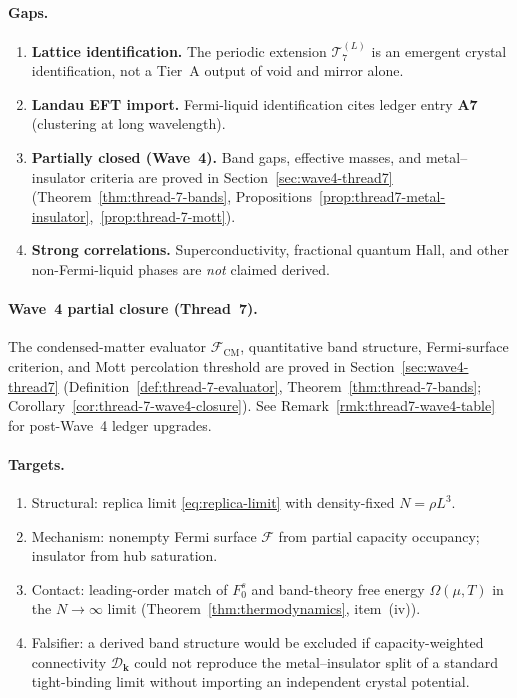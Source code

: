 \paragraph{Gaps.}
\begin{enumerate}[label=(\roman*),leftmargin=*]
  \item \textbf{Lattice identification.} The periodic extension
    $\mathcal{T}_7^{(L)}$ is an emergent crystal identification, not a Tier~A
    output of void and mirror alone.
  \item \textbf{Landau EFT import.} Fermi-liquid identification cites ledger
    entry \textbf{A7} (clustering at long wavelength).
  \item \textbf{Partially closed (Wave~4).}
    Band gaps, effective masses, and metal--insulator criteria are proved in
    Section~\ref{sec:wave4-thread7}
    (Theorem~\ref{thm:thread-7-bands},
    Propositions~\ref{prop:thread7-metal-insulator},~\ref{prop:thread-7-mott}).
  \item \textbf{Strong correlations.} Superconductivity, fractional quantum
    Hall, and other non-Fermi-liquid phases are \emph{not} claimed derived.
\end{enumerate}

\paragraph{Wave~4 partial closure (Thread~7).}
The condensed-matter evaluator $\mathcal{F}_{\mathrm{CM}}$,
quantitative band structure, Fermi-surface criterion, and Mott percolation
threshold are proved in Section~\ref{sec:wave4-thread7}
(Definition~\ref{def:thread-7-evaluator},
Theorem~\ref{thm:thread-7-bands};
Corollary~\ref{cor:thread-7-wave4-closure}).
See Remark~\ref{rmk:thread7-wave4-table} for post-Wave~4 ledger upgrades.

\paragraph{Targets.}
\begin{enumerate}[label=(\roman*),leftmargin=*]
  \item Structural: replica limit \eqref{eq:replica-limit} with density-fixed
    $N=\rho L^3$.
  \item Mechanism: nonempty Fermi surface $\mathcal{F}$ from partial capacity
    occupancy; insulator from hub saturation.
  \item Contact: leading-order match of $F_0^s$ and band-theory free energy
    $\Omega(\mu,T)$ in the $N\to\infty$ limit
    (Theorem~\ref{thm:thermodynamics}, item~(iv)).
  \item Falsifier: a derived band structure would be excluded if
    capacity-weighted connectivity $\mathcal{D}_{\mathbf{k}}$ could not
    reproduce the metal--insulator split of a standard tight-binding limit
    without importing an independent crystal potential.
\end{enumerate}

